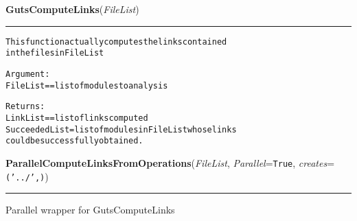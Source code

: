     \label{System:LinkManagement:GutsComputeLinks}

    \vspace{0.5ex}

\hspace{.8\funcindent}\begin{boxedminipage}{\funcwidth}

    \raggedright \textbf{GutsComputeLinks}(\textit{FileList})

    \vspace{-1.5ex}

    \rule{\textwidth}{0.5\fboxrule}
\setlength{\parskip}{2ex}
\begin{alltt}

This function actually computes the links contained
in the files in FileList

Argument: 
FileList == list of modules to analysis

Returns:
LinkList == list of links computed
Succeeded List = list of modules in FileList whose links 
        could be successfully obtained.
\end{alltt}

\setlength{\parskip}{1ex}
    \end{boxedminipage}

    \label{System:LinkManagement:ParallelComputeLinksFromOperations}

    \vspace{0.5ex}

\hspace{.8\funcindent}\begin{boxedminipage}{\funcwidth}

    \raggedright \textbf{ParallelComputeLinksFromOperations}(\textit{FileList}, \textit{Parallel}={\tt True}, \textit{creates}={\tt ('../',)})

    \vspace{-1.5ex}

    \rule{\textwidth}{0.5\fboxrule}
\setlength{\parskip}{2ex}
    Parallel wrapper for GutsComputeLinks

\setlength{\parskip}{1ex}
    \end{boxedminipage}

    \label{System:LinkManagement:GetStoredDefaultVal}

